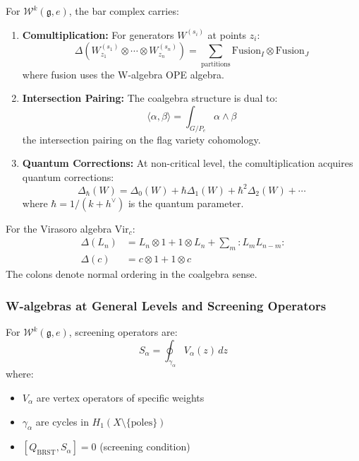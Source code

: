 \begin{theorem}\label{thm:w-bar-coalg}
For $\mathcal{W}^k(\mathfrak{g}, e)$, the bar complex carries:
\begin{enumerate}
\item \textbf{Comultiplication:} For generators $W^{(s_i)}$ at points $z_i$:
\[
\Delta(W^{(s_1)}_{z_1} \otimes \cdots \otimes W^{(s_n)}_{z_n}) = 
\sum_{\text{partitions}} \mathrm{Fusion}_I \otimes \mathrm{Fusion}_J
\]
where fusion uses the W-algebra OPE algebra.

\item \textbf{Intersection Pairing:} The coalgebra structure is dual to:
\[
\langle \alpha, \beta \rangle = \int_{G/P_e} \alpha \wedge \beta
\]
the intersection pairing on the flag variety cohomology.

\item \textbf{Quantum Corrections:} At non-critical level, the comultiplication acquires quantum corrections:
\[
\Delta_{\hbar}(W) = \Delta_0(W) + \hbar \Delta_1(W) + \hbar^2 \Delta_2(W) + \cdots
\]
where $\hbar = 1/(k + h^\vee)$ is the quantum parameter.
\end{enumerate}
\end{theorem}

\begin{example}
For the Virasoro algebra $\mathrm{Vir}_c$:
\begin{align}
\Delta(L_n) &= L_n \otimes 1 + 1 \otimes L_n + \sum_{m} :L_m L_{n-m}: \\
\Delta(c) &= c \otimes 1 + 1 \otimes c
\end{align}
The colons denote normal ordering in the coalgebra sense.
\end{example}

\subsubsection{W-algebras at General Levels and Screening Operators}

\begin{definition}\label{def:screening}
For $\mathcal{W}^k(\mathfrak{g}, e)$, screening operators are:
\[
S_{\alpha} = \oint_{\gamma_\alpha} V_\alpha(z) \, dz
\]
where:
\begin{itemize}
\item $V_\alpha$ are vertex operators of specific weights
\item $\gamma_\alpha$ are cycles in $H_1(X \setminus \{\text{poles}\})$
\item $[Q_{\mathrm{BRST}}, S_\alpha] = 0$ (screening condition)
\end{itemize}
\end{definition}

